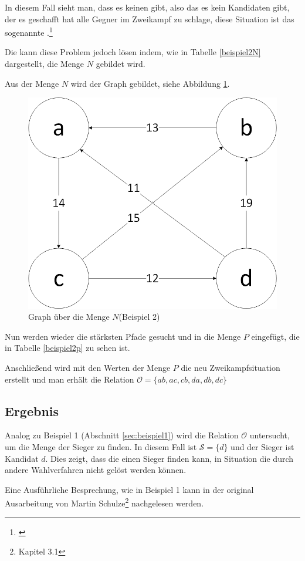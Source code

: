 In diesem Fall sieht man, dass es keinen \condorcetSieger gibt, also das es kein Kandidaten gibt, der es geschafft hat alle Gegner im Zweikampf zu schlage, diese Situation ist das sogenannte \condorcetParadox.\footnote{\Vgl \citet{EnricoSchoebel2018}}

\newpage
Die \schulze kann diese Problem jedoch lösen indem, wie in Tabelle \ref{beispiel2N} dargestellt, die Menge $N$ gebildet wird.



Aus der Menge $N$ wird der Graph gebildet, siehe Abbildung \ref{fig:graph2}.

\begin{figure}[!h]
\centering
\includegraphics[scale=0.5]{Bilder/Beispiel2_Graph.png}
\caption{Graph über die Menge $N$(Beispiel 2)}
\label{fig:graph2}
\end{figure}

Nun werden wieder die stärksten Pfade gesucht und in die Menge $P$ eingefügt, die in Tabelle \ref{beispiel2p} zu sehen ist.



Anschließend wird mit den Werten der Menge $P$ die neu Zweikampfsituation erstellt und man erhält die Relation $\mathcal{O} = \{ ab,ac,cb,da,db,dc \}$


\subsection{Ergebnis} 
\label{sec:ergebnis2}
Analog zu Beispiel 1 (Abschnitt \ref{sec:beispiel1}) wird die Relation $\mathcal{O}$ untersucht, um die Menge der Sieger zu finden. In diesem Fall ist $\mathcal{S}=\{d\}$  und der Sieger ist Kandidat $d$. Dies zeigt, dass die \schulze einen Sieger finden kann, in Situation die durch andere Wahlverfahren nicht gelöst werden können.

Eine Ausführliche Besprechung, wie in Beispiel 1 kann in der original Ausarbeitung von Martin Schulze\footnote{\Vgl \citet{Schulze2017} Kapitel 3.1} nachgelesen werden.
